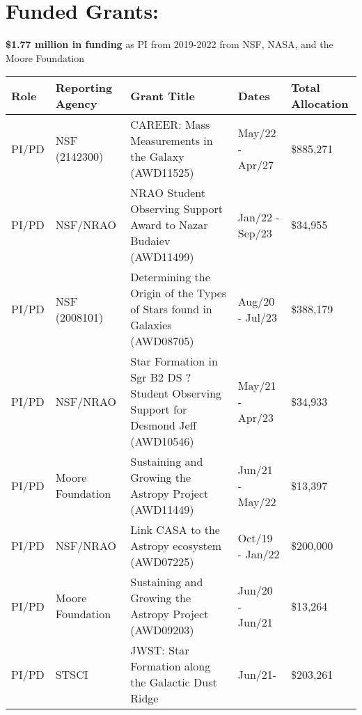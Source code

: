 \begin{minipage}{\textwidth}
\section*{Funded Grants: }


    \textbf{\$1.77 million in funding} as PI from 2019-2022 from NSF, NASA, and the Moore Foundation \\

\begin{tabular}{lp{1.0in}p{2.5in}p{0.6in}p{0.6in}}
Role & Reporting Agency & Grant Title & Dates & Total \mbox{Allocation}  \\
\hline
PI/PD & NSF (2142300) & CAREER: Mass Measurements in the Galaxy (AWD11525) & May/22 - Apr/27 & \$885,271  \\
PI/PD & NSF/NRAO & NRAO Student Observing Support Award to Nazar Budaiev (AWD11499) & Jan/22 - Sep/23 & \$34,955  \\
PI/PD & NSF (2008101) & Determining the Origin of the Types of Stars found in Galaxies (AWD08705) & Aug/20 - Jul/23 & \$388,179  \\
PI/PD & NSF/NRAO & Star Formation in Sgr B2 DS ? Student Observing Support for Desmond Jeff (AWD10546) & May/21 - Apr/23 & \$34,933   \\
PI/PD & Moore Foundation & Sustaining and Growing the Astropy Project (AWD11449) & Jun/21 - May/22 & \$13,397   \\
PI/PD & NSF/NRAO & Link CASA to the Astropy ecosystem (AWD07225) & Oct/19 - Jan/22 & \$200,000   \\
PI/PD & Moore Foundation & Sustaining and Growing the Astropy Project (AWD09203) & Jun/20 - Jun/21 & \$13,264   \\
PI/PD & STSCI & JWST: Star Formation along the Galactic Dust Ridge & Jun/21- &  \$203,261 \\
\end{tabular}
\end{minipage}
\vspace{4mm}
